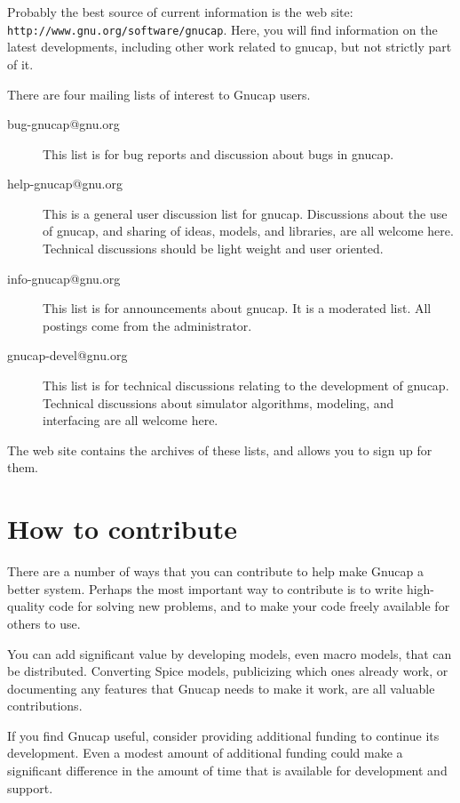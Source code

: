 Probably the best source of current information is the web site: {\tt
http://www.gnu.org/software/gnucap}.  Here, you will find information
on the latest developments, including other work related to gnucap,
but not strictly part of it.

There are four mailing lists of interest to Gnucap users.
\begin{description}

\item[bug-gnucap@gnu.org]
This list is for bug reports and discussion about bugs in gnucap.

\item[help-gnucap@gnu.org]
This is a general user discussion list for gnucap. Discussions about
the use of gnucap, and sharing of ideas, models, and libraries, are
all welcome here.  Technical discussions should be light weight and
user oriented.

\item[info-gnucap@gnu.org]
This list is for announcements about gnucap. It is a moderated
list. All postings come from the administrator.

\item[gnucap-devel@gnu.org]
This list is for technical discussions relating to the development of
gnucap.  Technical discussions about simulator algorithms, modeling,
and interfacing are all welcome here.

\end{description}

The web site contains the archives of these lists, and allows you to
sign up for them.
\section{How to contribute}

There are a number of ways that you can contribute to help make Gnucap
a better system. Perhaps the most important way to contribute is to
write high-quality code for solving new problems, and to make your
code freely available for others to use.

You can add significant value by developing models, even macro models,
that can be distributed. Converting Spice models, publicizing which
ones already work, or documenting any features that Gnucap needs to
make it work, are all valuable contributions.

If you find Gnucap useful, consider providing additional funding to
continue its development. Even a modest amount of additional funding
could make a significant difference in the amount of time that is
available for development and support.

